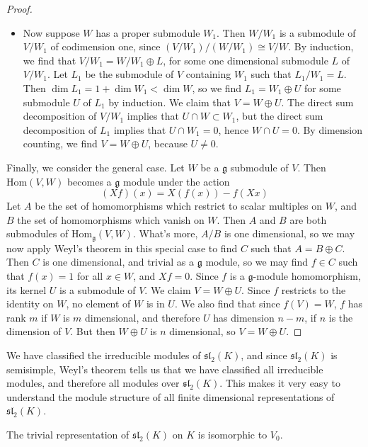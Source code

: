 \begin{proof}
\begin{itemize}
        \item Now suppose $W$ has a proper submodule $W_1$. Then $W/W_1$ is a submodule of $V/W_1$ of codimension one, since $(V/W_1)/(W/W_1) \cong V/W$. By induction, we find that $V/W_1 = W/W_1 \oplus L$, for some one dimensional submodule $L$ of $V/W_1$. Let $L_1$ be the submodule of $V$ containing $W_1$ such that $L_1/W_1 = L$. Then $\dim L_1 = 1 + \dim W_1 < \dim W$, so we find $L_1 = W_1 \oplus U$ for some submodule $U$ of $L_1$ by induction. We claim that $V = W \oplus U$. The direct sum decomposition of $V/W_1$ implies that $U \cap W \subset W_1$, but the direct sum decomposition of $L_1$ implies that $U \cap W_1 = 0$, hence $W \cap U = 0$. By dimension counting, we find $V = W \oplus U$, because $U \neq 0$.
    \end{itemize}
    Finally, we consider the general case. Let $W$ be a $\mathfrak{g}$ submodule of $V$. Then $\text{Hom}(V,W)$ becomes a $\mathfrak{g}$ module under the action
    \[ (Xf)(x) = X(f(x)) - f(Xx) \]
    Let $A$ be the set of homomorphisms which restrict to scalar multiples on $W$, and $B$ the set of homomorphisms which vanish on $W$. Then $A$ and $B$ are both submodules of $\text{Hom}_\mathfrak{g}(V,W)$. What's more, $A/B$ is one dimensional, so we may now apply Weyl's theorem in this special case to find $C$ such that $A = B \oplus C$. Then $C$ is one dimensional, and trivial as a $\mathfrak{g}$ module, so we may find $f \in C$ such that $f(x) = 1$ for all $x \in W$, and $Xf = 0$. Since $f$ is a $\mathfrak{g}$-module homomorphism, its kernel $U$ is a submodule of $V$. We claim $V = W \oplus U$. Since $f$ restricts to the identity on $W$, no element of $W$ is in $U$. We also find that since $f(V) = W$, $f$ has rank $m$ if $W$ is $m$ dimensional, and therefore $U$ has dimension $n - m$, if $n$ is the dimension of $V$. But then $W \oplus U$ is $n$ dimensional, so $V = W \oplus U$.
\end{proof}

We have classified the irreducible modules of $\mathfrak{sl}_2(K)$, and since $\mathfrak{sl}_2(K)$ is semisimple, Weyl's theorem tells us that we have classified all irreducible modules, and therefore all modules over $\mathfrak{sl}_2(K)$. This makes it very easy to understand the module structure of all finite dimensional representations of $\mathfrak{sl}_2(K)$.

\begin{example}
    The trivial representation of $\mathfrak{sl}_2(K)$ on $K$ is isomorphic to $V_0$.
\end{example}

